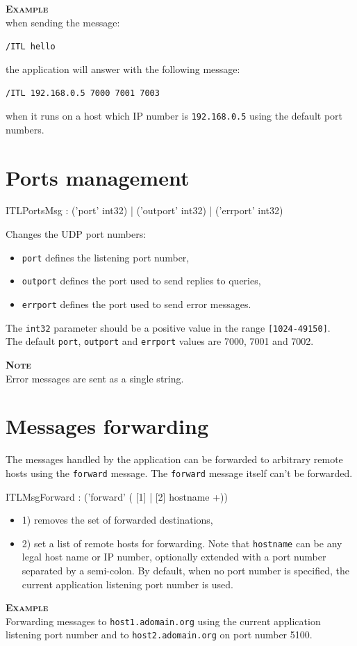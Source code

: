 \documentclass[a4paper,twoside]{report}
\newcommand{\sublevel}[1]	{\section{#1}}
\newcommand{\OSC}[1]		{\texttt{#1}}
\newcommand{\values}[1]	{\texttt{#1}}
\newcommand{\example}		{\textbf{\hspace{-1.5cm}\textbf{\textsc{Example }}}}
\newcommand{\note}	[1]		{\vspace{2mm}\textbf{\hspace{-1.03cm}\textbf{\textsc{Note #1}}}}
\newcommand{\sample}	[1]			{\vspace{-2mm}\begin{center}\colorbox{mygrey}{
								\begin{minipage}[t]{0.9\columnwidth} 
								{\small \texttt{#1}}
								\end{minipage}}\end{center}}
\newcommand{\sampleindent}	{ \hspace{0.5cm} }
\begin{document}
\example \\
when sending the message:
\sample{/ITL hello}
\sampleindent the application will answer with the following message:
\sample{/ITL 192.168.0.5  7000 7001 7003}
\sampleindent when it runs on a host which IP number is \OSC{192.168.0.5} using the default port numbers.

\sublevel{Ports management}
\label{ITLPorts}

\begin{rail}
ITLPortsMsg : ('port' int32)
		| ('outport' int32)
		| ('errport' int32)
\end{rail}

Changes the UDP port numbers:
\begin{itemize}
\item \OSC{port} defines the listening port number, 
\item \OSC{outport} defines the port used to send replies to queries, 
\item \OSC{errport} defines the port used to send error messages. 
\end{itemize}
The \OSC{int32} parameter should be a positive value in the range \values{[1024-49150]}. \\
The default \OSC{port}, \OSC{outport} and \OSC{errport} values are 7000, 7001 and 7002.

\note{} \\
Error messages are sent as a single string.

\sublevel{Messages forwarding}
\label{ITLForward}

The messages handled by the application can be forwarded to arbitrary remote hosts using the \OSC{forward} message. The \OSC{forward} message itself can't be forwarded. 
 
\begin{rail}
ITLMsgForward : ('forward' ( [1] | [2] hostname +))
\end{rail}

\begin{itemize}

\item 1) removes the set of forwarded destinations,
\item 2) set a list of remote hosts for forwarding. Note that \OSC{hostname} can be any legal host name or IP number, optionally extended with a port number separated by a semi-colon. By default, when no port number is specified, the current application listening port number is used.
\end{itemize}
\example\\
Forwarding messages to \OSC{host1.adomain.org} using the current application listening port number
and to \OSC{host2.adomain.org} on port number 5100.
\end{document}
